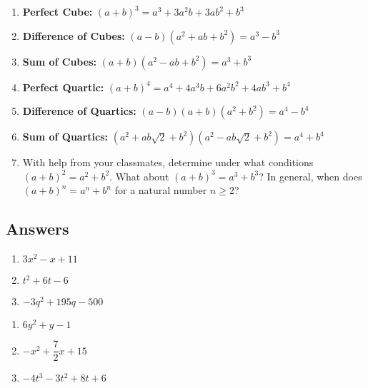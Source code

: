 \documentclass{ximera}
\begin{document}
\begin{enumerate}
\setcounter{enumi}{\value{HW}}

\item \textbf{Perfect Cube:} $(a+b)^3 = a^3 + 3a^2b + 3ab^2 + b^3$ \label{specialformexfirst}

\item  \textbf{Difference of Cubes:} $(a - b)(a^2 + ab + b^2) = a^3 - b^3$

\item  \textbf{Sum of Cubes:} $(a + b)(a^2 - ab + b^2) = a^3 + b^3$

\item  \textbf{Perfect Quartic:} $(a+b)^4 = a^4 + 4a^3b + 6a^2b^2 + 4ab^3 + b^4$

\item  \textbf{Difference of Quartics:} $(a-b)(a+b)(a^2+b^2) = a^4 - b^4$

\item  \textbf{Sum of Quartics:}  $(a^2 + ab \sqrt{2} + b^2)(a^2 - ab \sqrt{2} + b^2) = a^4 + b^4$ \label{specialformexlast}

\item  With help from your classmates, determine under what conditions $(a+b)^2 = a^2 + b^2$.  What about $(a+b)^3 = a^3 + b^3$? In general, when does $(a+b)^n = a^n + b^n$ for a natural number $n \geq 2$?

\setcounter{HW}{\value{enumi}}
\end{enumerate}


\newpage

\subsection{Answers}
\begin{multicols}{3}
\begin{enumerate}

\item $3x^2 - x + 11$
\item $t^2 + 6t-6$
\item $-3q^2+195q-500$

\setcounter{HW}{\value{enumi}}
\end{enumerate}
\end{multicols}

\begin{multicols}{3}
\begin{enumerate}
\setcounter{enumi}{\value{HW}}

\item $6y^2+y-1$
\item $-x^2 + \dfrac{7}{2} x + 15$
\item $-4t^3-3t^2+8t+6$

\setcounter{HW}{\value{enumi}}
\end{enumerate}
\end{multicols}
\end{document}

